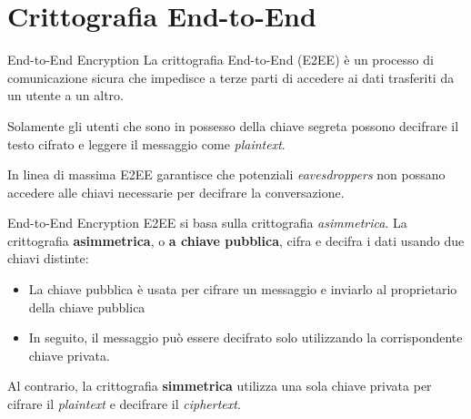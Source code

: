 \section{Crittografia End-to-End}
\begin{frame}{End-to-End Encryption}
    La crittografia End-to-End (E2EE) è un processo di comunicazione sicura che impedisce a terze parti di accedere ai dati trasferiti da un utente a un altro.\newline\pause
    
    Solamente gli utenti che sono in possesso della chiave segreta possono decifrare il testo cifrato e leggere il messaggio come \textit{plaintext}.\newline\pause

    In linea di massima E2EE garantisce che potenziali \textit{eavesdroppers} non possano accedere alle chiavi necessarie per decifrare la conversazione. 
    \cite{greenbergE2EE}


\end{frame}

\begin{frame}{End-to-End Encryption}
    E2EE si basa sulla crittografia \textit{asimmetrica}.\newline
    La crittografia \textbf{asimmetrica}, o \textbf{a chiave pubblica}, cifra e decifra i dati usando due chiavi distinte:\pause
    \begin{itemize}
        \item La chiave pubblica è usata per cifrare un messaggio e inviarlo al proprietario della chiave pubblica\pause
        \item In seguito, il messaggio può essere decifrato solo utilizzando la corrispondente chiave privata.\pause
    \end{itemize}

    Al contrario, la crittografia \textbf{simmetrica} utilizza una sola chiave privata per cifrare il \textit{plaintext} e decifrare il \textit{ciphertext}.


\end{frame}

